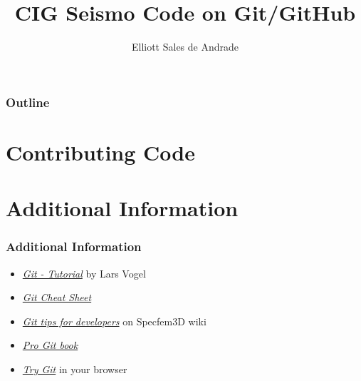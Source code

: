 \documentclass{beamer}
\author{Elliott Sales de Andrade}
\title{CIG Seismo Code on Git/GitHub}
\institute{University of Toronto}
\begin{document}
\begin{frame}
 \titlepage
\end{frame}

\begin{frame}
 \frametitle{Outline}
 \tableofcontents
\end{frame}







\section{Contributing Code}

\section{Additional Information}

\begin{frame}
 \frametitle{Additional Information}

 \begin{itemize}
  \item \href{http://www.vogella.com/tutorials/Git/article.html}{\textit{Git - Tutorial}}
   by Lars Vogel
  \item \href{http://www.git-tower.com/blog/git-cheat-sheet/}{\textit{Git Cheat Sheet}}
  \item \href{https://github.com/geodynamics/specfem3d/wiki/Git-tips-for-developers}{\textit{Git tips for developers}}
   on Specfem3D wiki
  \item \href{http://git-scm.com/book}{\textit{Pro Git book}}
  \item \href{https://try.github.io/levels/1/challenges/1}{\textit{Try Git}}
   in your browser
 \end{itemize}
\end{frame}
\end{document}
